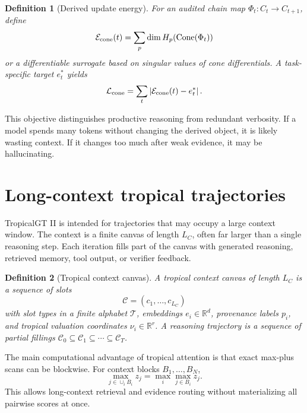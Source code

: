 \documentclass[11pt]{article}
\newtheorem{definition}{Definition}[section]
\newcommand{\R}{\mathbb{R}}
\newcommand{\calC}{\mathcal{C}}
\newcommand{\calE}{\mathcal{E}}
\newcommand{\calL}{\mathcal{L}}
\newcommand{\calT}{\mathcal{T}}
\newcommand{\abs}[1]{\left\lvert #1\right\rvert}
\begin{document}
\begin{definition}[Derived update energy]
For an audited chain map \(\Phi_t:C_t\to C_{t+1}\), define
\begin{equation}
\calE_{\rm cone}(t)=\sum_p \dim H_p(\mathrm{Cone}(\Phi_t))
\end{equation}
or a differentiable surrogate based on singular values of cone differentials.  A task-specific target \(e_t^*\) yields
\begin{equation}
\calL_{\rm cone}=\sum_t\abs{\calE_{\rm cone}(t)-e_t^*}.
\end{equation}
\end{definition}

This objective distinguishes productive reasoning from redundant verbosity.  If a model spends many tokens without changing the derived object, it is likely wasting context.  If it changes too much after weak evidence, it may be hallucinating.

\section{Long-context tropical trajectories}

TropicalGT II is intended for trajectories that may occupy a large context window.  The context is a finite canvas of length \(L_C\), often far larger than a single reasoning step.  Each iteration fills part of the canvas with generated reasoning, retrieved memory, tool output, or verifier feedback.

\begin{definition}[Tropical context canvas]
A tropical context canvas of length \(L_C\) is a sequence of slots
\begin{equation}
\calC=(c_1,\ldots,c_{L_C})
\end{equation}
with slot types in a finite alphabet \(\calT\), embeddings \(e_i\in\R^d\), provenance labels \(p_i\), and tropical valuation coordinates \(\nu_i\in\R^r\).  A reasoning trajectory is a sequence of partial fillings \(\calC_0\subseteq\calC_1\subseteq\cdots\subseteq\calC_T\).
\end{definition}

The main computational advantage of tropical attention is that exact max-plus scans can be blockwise.  For context blocks \(B_1,
\ldots,B_N\),
\begin{equation}
\max_{j\in\cup_iB_i} z_j=\max_i\max_{j\in B_i}z_j.
\end{equation}
This allows long-context retrieval and evidence routing without materializing all pairwise scores at once.
\end{document}
